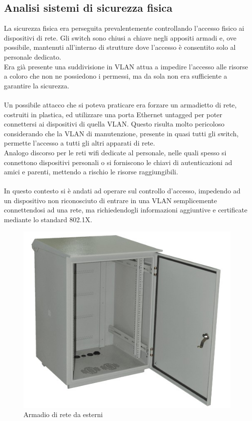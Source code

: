 \documentclass[Realizzazione.tex]{subfiles}
\begin{document}
\subsection{Analisi sistemi di sicurezza fisica}
La sicurezza fisica era perseguita prevalentemente controllando l'accesso fisico ai dispositivi di rete. Gli switch sono chiusi a chiave negli appositi armadi e, ove possibile, mantenuti all'interno di strutture dove l'accesso è consentito solo al personale dedicato. \\
Era già presente una suddivisione in VLAN attua a impedire l'accesso alle risorse a coloro che non ne possiedono i permessi, ma da sola non era sufficiente a garantire la sicurezza. \\\\
Un possibile attacco che si poteva praticare era forzare un armadietto di rete, costruiti in plastica, ed utilizzare una porta Ethernet untagged per poter connettersi ai dispositivi di quella VLAN. Questo risulta molto pericoloso considerando che la VLAN di manutenzione, presente in quasi tutti gli switch, permette l'accesso a tutti gli altri apparati di rete. \\
Analogo discorso per le reti wifi dedicate al personale, nelle quali spesso si connettono dispositivi personali o si forniscono le chiavi di autenticazioni ad amici e parenti, mettendo a rischio le risorse raggiungibili. \\\\
In questo contesto si è andati ad operare sul controllo d'accesso, impedendo ad un dispositivo non riconosciuto di entrare in una VLAN semplicemente connettendosi ad una rete, ma richiedendogli informazioni aggiuntive e certificate mediante lo standard 802.1X.

\begin{figure}[H]
	\centering
	\includegraphics[width=0.45\linewidth]{"images/Outdoor rack"}
	\caption{Armadio di rete da esterni}
	\label{fig:Armadio di rete da esterni}
\end{figure}
\end{document}
